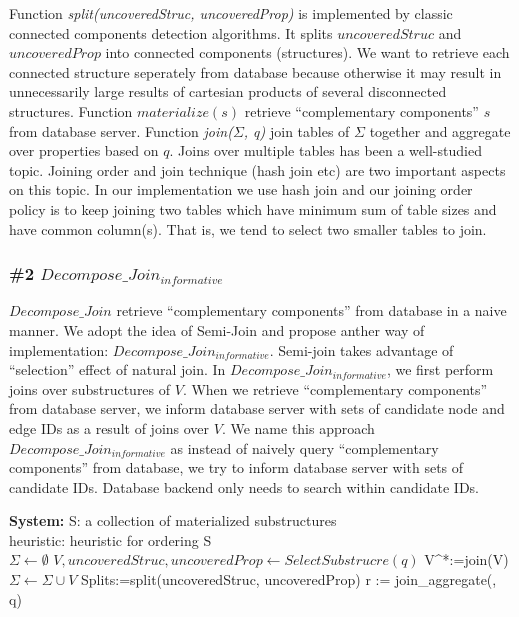 Function \textit{split(uncoveredStruc, uncoveredProp)} is implemented by classic connected components detection algorithms. It splits $uncoveredStruc$ and $uncoveredProp$ into connected components (structures). We want to retrieve each connected structure seperately from database because otherwise it may result in unnecessarily large results of cartesian products of several disconnected structures. Function \textit{$materialize(s)$} retrieve ``complementary components'' $s$ from database server. Function \textit{join($\Sigma$, q)} join tables of $\Sigma$ together and aggregate over properties based on $q$. Joins over multiple tables has been a well-studied topic. Joining order and join technique (hash join etc) are two important aspects on this topic. In our implementation we use hash join and our joining order policy is to keep joining two tables which have minimum sum of table sizes and have common column(s). That is, we tend to select two smaller tables to join.  

\subsubsection{\#2 $Decompose\_Join_{informative}$}
$Decompose\_Join$ retrieve ``complementary components'' from database in a naive manner. We adopt the idea of Semi-Join \cite{DBLP:journals/dr/Ozsoyoglu99} and propose anther way of implementation: $Decompose\_Join_{informative}$. Semi-join takes advantage of ``selection'' effect of natural join. In $Decompose\_Join_{informative}$, we first perform joins over substructures of $V$. When we retrieve ``complementary components'' from database server, we inform database server with sets of candidate node and edge IDs as a result of joins over $V$. We name this approach $Decompose\_Join_{informative}$ as instead of naively query ``complementary components'' from database, we try to inform database server with sets of candidate IDs. Database backend only needs to search within candidate IDs.

\begin{algorithm}[H]
\caption{$Decompose\_Join_{informative}$}
\LinesNumbered
\textbf{System:} S: a collection of materialized substructures\\ heuristic: heuristic for ordering S\\
$\Sigma \gets \emptyset $\;
$V, uncoveredStruc, uncoveredProp \gets SelectSubstrucre(q) $\;
V^{*}:=join(V)\;
$\Sigma \gets \Sigma \cup V $\;
Splits:=split(uncoveredStruc, uncoveredProp)\;
r := join\_aggregate(\Sigma, q)\;
\end{algorithm}
\clearpage

